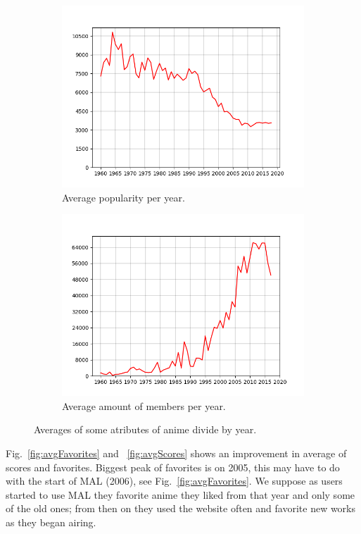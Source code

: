 \begin{figure}
\begin{subfigure}{.55\columnwidth}
		\includegraphics[width=\columnwidth]{graphics/avgPopularities.png}
		\caption{Average popularity per year.}
		\label{fig:avgPopularities}
	\end{subfigure}%
	\begin{subfigure}{.55\columnwidth}
		\centering
		\includegraphics[width=\columnwidth]{graphics/avgMembers.png}
		\caption{Average amount of members per year.}
		\label{fig:avgMembers}
	\end{subfigure}
	\caption{Averages of some atributes of anime divide by year.}
	\label{fig:averages}
\end{figure}

Fig.~\ref{fig:avgFavorites} and ~\ref{fig:avgScores} shows an improvement in average of scores and favorites. 
Biggest peak of favorites is on 2005, this may have to do with the start of MAL (2006), see Fig.~\ref{fig:avgFavorites}. We suppose as users started to use MAL they favorite anime they liked from that year and only some of the old ones; from then on they used the website often and favorite new works as they began airing.


